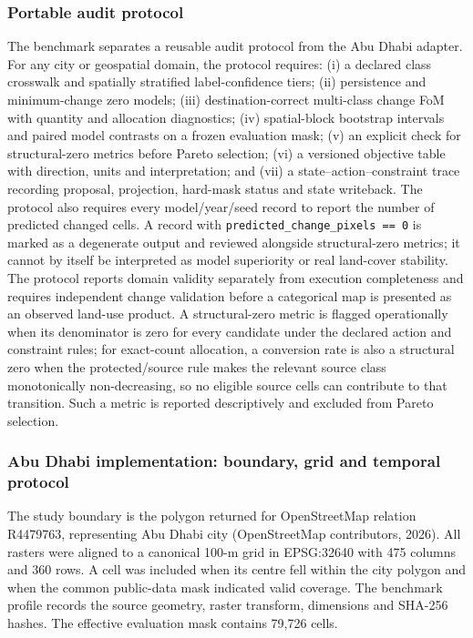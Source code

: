 \subsubsection{Portable audit protocol}\label{portable-audit-protocol}

The benchmark separates a reusable audit protocol from the Abu Dhabi
adapter. For any city or geospatial domain, the protocol requires: (i) a
declared class crosswalk and spatially stratified label-confidence
tiers; (ii) persistence and minimum-change zero models; (iii)
destination-correct multi-class change FoM with quantity and allocation
diagnostics; (iv) spatial-block bootstrap intervals and paired model
contrasts on a frozen evaluation mask; (v) an explicit check for
structural-zero metrics before Pareto selection; (vi) a versioned
objective table with direction, units and interpretation; and (vii) a
state--action--constraint trace recording proposal, projection,
hard-mask status and state writeback. The protocol also requires every
model/year/seed record to report the number of predicted changed cells.
A record with \texttt{predicted\_change\_pixels\ ==\ 0} is marked as a
degenerate output and reviewed alongside structural-zero metrics; it
cannot by itself be interpreted as model superiority or real land-cover
stability. The protocol reports domain validity separately from
execution completeness and requires independent change validation before
a categorical map is presented as an observed land-use product. A
structural-zero metric is flagged operationally when its denominator is
zero for every candidate under the declared action and constraint rules;
for exact-count allocation, a conversion rate is also a structural zero
when the protected/source rule makes the relevant source class
monotonically non-decreasing, so no eligible source cells can contribute
to that transition. Such a metric is reported descriptively and excluded
from Pareto selection.

\subsubsection{Abu Dhabi implementation: boundary, grid and temporal
protocol}\label{abu-dhabi-implementation-boundary-grid-and-temporal-protocol}

The study boundary is the polygon returned for OpenStreetMap relation
R4479763, representing Abu Dhabi city (OpenStreetMap contributors,
2026). All rasters were aligned to a canonical 100-m grid in EPSG:32640
with 475 columns and 360 rows. A cell was included when its centre fell
within the city polygon and when the common public-data mask indicated
valid coverage. The benchmark profile records the source geometry,
raster transform, dimensions and SHA-256 hashes. The effective
evaluation mask contains 79,726 cells.

